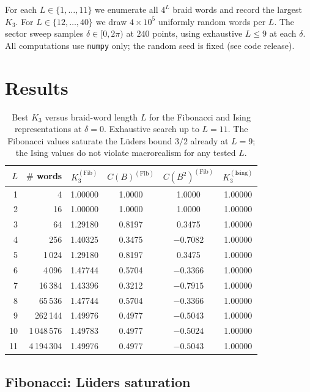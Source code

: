 \documentclass[aps,prx,reprint,amsmath,amssymb,floatfix,nofootinbib,superscriptaddress]{revtex4-2}
\begin{document}
For each $L \in \{1,\ldots,11\}$ we enumerate all $4^{L}$ braid words
and record the largest $K_{3}$. For $L \in \{12,\ldots,40\}$ we draw
$4\times 10^{5}$ uniformly random words per $L$. The sector sweep
samples $\delta \in [0, 2\pi)$ at $240$ points, using exhaustive
$L \leq 9$ at each $\delta$. All computations use
\texttt{numpy} only; the random seed is fixed (see code release).

\section{Results}
\label{sec:results}

\begin{table}
\caption{Best $K_{3}$ versus braid-word length $L$ for the Fibonacci
and Ising representations at $\delta=0$. Exhaustive search up to
$L=11$. The Fibonacci values saturate the L\"uders bound $3/2$
already at $L=9$; the Ising values do not violate macrorealism for
any tested $L$.}
\label{tab:K3_L}
\centering
\begin{tabular}{rrcccc}
\toprule
$L$ & $\#$ words & $K_{3}^{(\mathrm{Fib})}$ & $C(B)^{(\mathrm{Fib})}$
    & $C(B^{2})^{(\mathrm{Fib})}$ & $K_{3}^{(\mathrm{Ising})}$ \\
\midrule
1  & 4         & 1.00000 &  1.0000 &  1.0000 & 1.00000 \\
2  & 16        & 1.00000 &  1.0000 &  1.0000 & 1.00000 \\
3  & 64        & 1.29180 &  0.8197 &  0.3475 & 1.00000 \\
4  & 256       & 1.40325 &  0.3475 & $-0.7082$ & 1.00000 \\
5  & 1\,024    & 1.29180 &  0.8197 &  0.3475 & 1.00000 \\
6  & 4\,096    & 1.47744 &  0.5704 & $-0.3366$ & 1.00000 \\
7  & 16\,384   & 1.43396 &  0.3212 & $-0.7915$ & 1.00000 \\
8  & 65\,536   & 1.47744 &  0.5704 & $-0.3366$ & 1.00000 \\
9  & 262\,144  & 1.49976 &  0.4977 & $-0.5043$ & 1.00000 \\
10 & 1\,048\,576 & 1.49783 & 0.4977 & $-0.5024$ & 1.00000 \\
11 & 4\,194\,304 & 1.49976 & 0.4977 & $-0.5043$ & 1.00000 \\
\bottomrule
\end{tabular}
\end{table}

\subsection{Fibonacci: L\"uders saturation}
\end{document}

